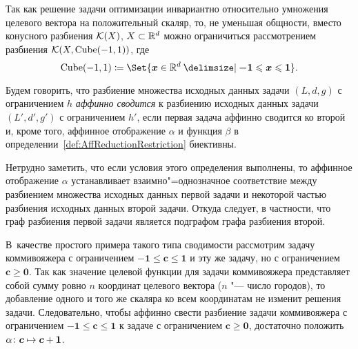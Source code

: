 \begin{remark}
Так как решение задачи оптимизации инвариантно относительно умножения целевого вектора на положительный скаляр, то, не уменьшая общности, вместо конусного разбиения ${\mathcal K}(X)$, $X \subset \mathbb{R}^d$ можно ограничиться рассмотрением разбиения ${\mathcal K}(X,\textup{Cube}(-1,1))$, где 
\[
\Cube(-1,1) \coloneqq \Set{\bm{x} \in \R^d \given \bm{-1} \le \bm{x} \le \bm{1}}.
\]
\end{remark}



\begin{definition}
\label{def:ConesReduction}
\sloppy
Будем говорить, что разбиение множества исходных данных задачи $(L,d,g)$ с ограничением $h$ \emph{аффинно сводится} к разбиению исходных данных задачи $(L',d',g')$ с ограничением $h'$, если первая задача аффинно сводится ко второй и, кроме того, аффинное отображение $\alpha$ и функция $\beta$ в определении~\ref{def:AffReductionRestriction} биективны.
\end{definition}

Нетрудно заметить, что если условия этого определения выполнены, то аффинное отображение $\alpha$ устанавливает взаимно"=однозначное соответствие между разбиением множества исходных данных первой задачи и некоторой частью разбиения исходных данных второй задачи. Откуда следует, в частности, что граф разбиения первой задачи является подграфом графа разбиения второй.

В~качестве простого примера такого типа сводимости рассмотрим задачу коммивояжера с ограничением $\bm{-1} \le \bm{c} \le \bm{1}$ и эту же задачу, но с ограничением $\bm{c} \ge \bm{0}$. Так как значение целевой функции для задачи коммивояжера представляет собой сумму ровно $n$ координат целевого вектора ($n$ "--- число городов), то добавление одного и того же скаляра ко всем координатам не изменит решения задачи.
Следовательно, чтобы аффинно свести разбиение задачи коммивояжера с ограничением $\bm{-1} \le \bm{c} \le \bm{1}$ к задаче с ограничением $\bm{c} \ge \bm{0}$, достаточно положить $\alpha \colon \bm{c} \mapsto \bm{c} + \bm{1}$.


%
%

